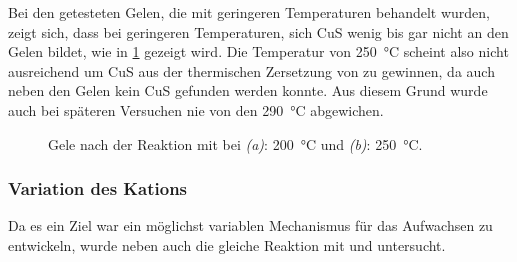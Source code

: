 		Bei den getesteten Gelen, die mit geringeren Temperaturen behandelt wurden, zeigt sich, dass bei geringeren Temperaturen, sich CuS wenig bis gar nicht an den Gelen bildet, wie in \cref{fig:Gel-E-Temp} gezeigt wird.
		Die Temperatur von \SI{250}{\degreeCelsius} scheint also nicht ausreichend um CuS aus der thermischen Zersetzung von  zu gewinnen, da auch neben den Gelen kein CuS gefunden werden konnte.
		Aus diesem Grund wurde auch bei späteren Versuchen nie von den \SI{290}{\degreeCelsius} abgewichen.
		\begin{figure}[H]
			\centering
			\caption{Gele nach der Reaktion mit  bei \emph{(a)}: \SI{200}{\degreeCelsius} und \emph{(b)}: \SI{250}{\degreeCelsius}.}
			\label{fig:Gel-E-Temp}
		\end{figure}
	
	\subsubsection{Variation des Kations}
	
		Da es ein Ziel war ein möglichst variablen Mechanismus für das Aufwachsen zu entwickeln, wurde neben  auch die gleiche Reaktion mit  und  untersucht.
		
